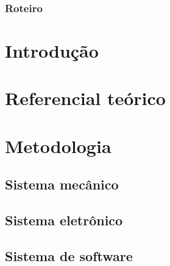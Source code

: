 \documentclass{beamer}
\begin{document}
\begin{frame}
\titlepage
\end{frame}

\begin{frame}
\frametitle{Roteiro}
\tableofcontents[currentsection, hideothersubsections, sectionstyle=show/show]
\end{frame}

\section{Introdução}






\section{Referencial teórico}





\section{Metodologia}

\subsection{Sistema mecânico}




    
\subsection{Sistema eletrônico}











\subsection{Sistema de software}





\end{document}
